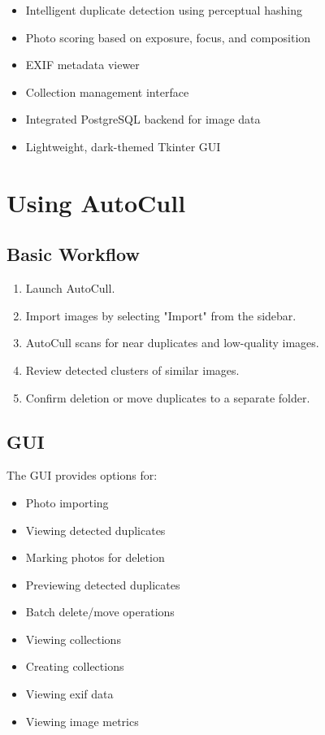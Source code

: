 \documentclass[12pt,a4paper]{article}
\begin{document}
\begin{itemize}
    \item Intelligent duplicate detection using perceptual hashing
    \item Photo scoring based on exposure, focus, and composition
    \item EXIF metadata viewer
    \item Collection management interface
    \item Integrated PostgreSQL backend for image data
    \item Lightweight, dark-themed Tkinter GUI
\end{itemize}


\section{Using AutoCull}

\subsection{Basic Workflow}

\begin{enumerate}[label=\arabic*.]
    \item Launch AutoCull.
    \item Import images by selecting "Import" from the sidebar.
    \item AutoCull scans for near duplicates and low-quality images.
    \item Review detected clusters of similar images.
    \item Confirm deletion or move duplicates to a separate folder.
\end{enumerate}

\subsection{GUI}
The GUI provides options for:
\begin{itemize}
    \item Photo importing
    \item Viewing detected duplicates
    \item Marking photos for deletion
    \item Previewing detected duplicates
    \item Batch delete/move operations
    \item Viewing collections
    \item Creating collections
    \item Viewing exif data
    \item Viewing image metrics
\end{itemize}
\end{document}
